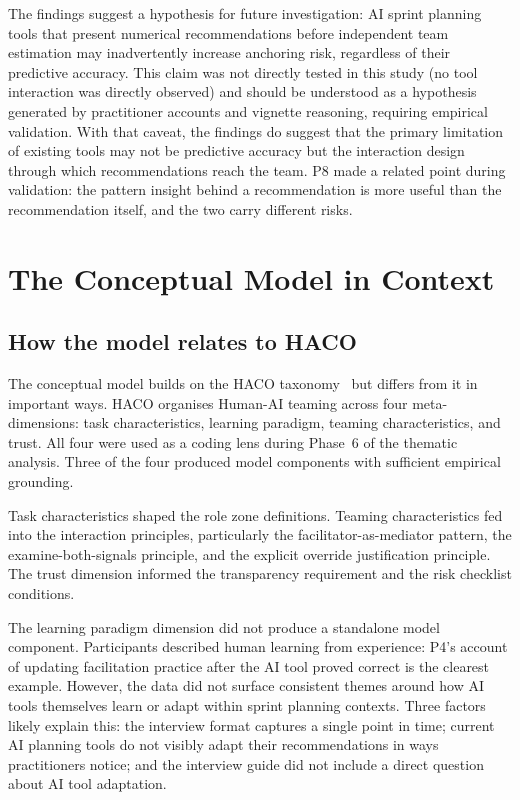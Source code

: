 \documentclass[a4paper,twoside]{bth}
\begin{document}
The findings suggest a hypothesis for future investigation: AI sprint planning tools that present numerical recommendations before independent team estimation may inadvertently increase anchoring risk, regardless of their predictive accuracy. This claim was not directly tested in this study (no tool interaction was directly observed) and should be understood as a hypothesis generated by practitioner accounts and vignette reasoning, requiring empirical validation. With that caveat, the findings do suggest that the primary limitation of existing tools may not be predictive accuracy but the interaction design through which recommendations reach the team. P8 made a related point during validation: the pattern insight behind a recommendation is more useful than the recommendation itself, and the two carry different risks.

\section{The Conceptual Model in Context}

\subsection{How the model relates to HACO}

The conceptual model builds on the HACO taxonomy~\cite{dubey2020haco} but differs from it in important ways. HACO organises Human-AI teaming across four meta-dimensions: task characteristics, learning paradigm, teaming characteristics, and trust. All four were used as a coding lens during Phase~6 of the thematic analysis. Three of the four produced model components with sufficient empirical grounding.

Task characteristics shaped the role zone definitions. Teaming characteristics fed into the interaction principles, particularly the facilitator-as-mediator pattern, the examine-both-signals principle, and the explicit override justification principle. The trust dimension informed the transparency requirement and the risk checklist conditions.

The learning paradigm dimension did not produce a standalone model component. Participants described human learning from experience: P4's account of updating facilitation practice after the AI tool proved correct is the clearest example. However, the data did not surface consistent themes around how AI tools themselves learn or adapt within sprint planning contexts. Three factors likely explain this: the interview format captures a single point in time; current AI planning tools do not visibly adapt their recommendations in ways practitioners notice; and the interview guide did not include a direct question about AI tool adaptation.
\end{document}
